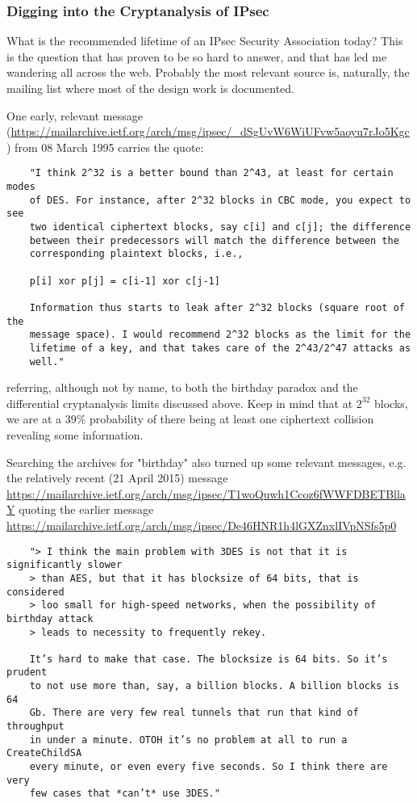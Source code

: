 \documentclass[%
 aip,
 jmp,%
 amsmath,amssymb,
 reprint,%
]{revtex4-1}
\begin{document}
\subsubsection{Digging into the Cryptanalysis of IPsec}

What is the recommended lifetime of an IPsec Security Association
today?  This is the question that has proven to be so hard to answer,
and that has led me wandering all across the web.  Probably the most
relevant source is, naturally, the mailing list where most of the
design work is documented.

One early, relevant message
(\url{https://mailarchive.ietf.org/arch/msg/ipsec/_dSgUvW6WiUFvw5aoyu7rJo5Kgc})
from 08 March 1995 carries the quote:

\begin{verbatim}
	"I think 2^32 is a better bound than 2^43, at least for certain modes
	of DES. For instance, after 2^32 blocks in CBC mode, you expect to see
	two identical ciphertext blocks, say c[i] and c[j]; the difference
	between their predecessors will match the difference between the
	corresponding plaintext blocks, i.e.,

	p[i] xor p[j] = c[i-1] xor c[j-1]

	Information thus starts to leak after 2^32 blocks (square root of the
	message space). I would recommend 2^32 blocks as the limit for the
	lifetime of a key, and that takes care of the 2^43/2^47 attacks as
	well."
\end{verbatim}
referring, although not by name, to both the birthday paradox and the
differential cryptanalysis limits discussed above.  Keep in mind that
at $2^{32}$ blocks, we are at a 39\% probability of there being at least
one ciphertext collision revealing some information.

Searching the archives for "birthday" also turned up some relevant
messages, e.g. the relatively recent (21 April 2015) message
\url{https://mailarchive.ietf.org/arch/msg/ipsec/T1woQuwh1Ccoz6fWWFDBETBllaY}
quoting the earlier message
\url{https://mailarchive.ietf.org/arch/msg/ipsec/De46HNR1h4lGXZnxlIVpNSfs5p0}

\begin{verbatim}
	"> I think the main problem with 3DES is not that it is significantly slower
	> than AES, but that it has blocksize of 64 bits, that is considered
	> loo small for high-speed networks, when the possibility of birthday attack
	> leads to necessity to frequently rekey.

	It’s hard to make that case. The blocksize is 64 bits. So it’s prudent
	to not use more than, say, a billion blocks. A billion blocks is 64
	Gb. There are very few real tunnels that run that kind of throughput
	in under a minute. OTOH it’s no problem at all to run a CreateChildSA
	every minute, or even every five seconds. So I think there are very
	few cases that *can’t* use 3DES."
\end{verbatim}
\end{document}

